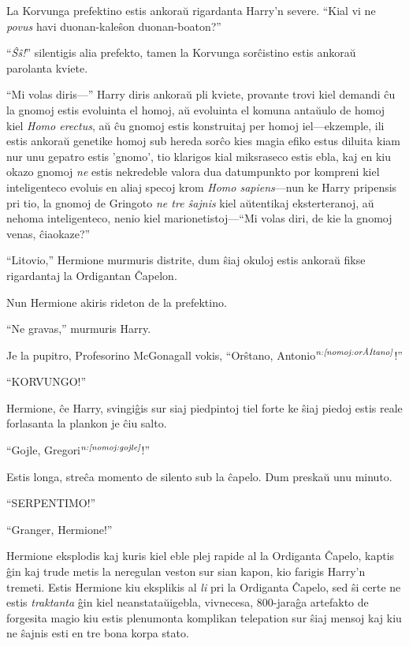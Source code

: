 La Korvunga prefektino estis ankoraŭ rigardanta Harry'n severe. ``Kial
vi ne \emph{povus} havi duonan-kaleŝon duonan-boaton?''

``\emph{Ŝŝ!}'' silentigis alia prefekto, tamen la Korvunga sorĉistino
estis ankoraŭ parolanta kviete.

``Mi volas diris—'' Harry diris ankoraŭ pli kviete, provante trovi
kiel demandi ĉu la gnomoj estis evoluinta el homoj, aŭ evoluinta el
komuna antaŭulo de homoj kiel \emph{Homo erectus}, aŭ ĉu gnomoj estis
konstruitaj per homoj iel—ekzemple, ili estis ankoraŭ genetike homoj
sub hereda sorĉo kies magia efiko estus diluita kiam nur unu gepatro
estis 'gnomo', tio klarigos kial miksraseco estis ebla, kaj en kiu
okazo gnomoj \emph{ne} estis nekredeble valora dua datumpunkto por
kompreni kiel inteligenteco evoluis en aliaj specoj krom \emph{Homo
  sapiens}—nun ke Harry pripensis pri tio, la gnomoj de Gringoto
\emph{ne tre ŝajnis} kiel aŭtentikaj eksterteranoj, aŭ nehoma
inteligenteco, nenio kiel marionetistoj—``Mi volas diri, de kie la
gnomoj venas, ĉiaokaze?''

``Litovio,'' Hermione murmuris distrite, dum ŝiaj okuloj estis ankoraŭ
fikse rigardantaj la Ordigantan Ĉapelon.

Nun Hermione akiris rideton de la prefektino.

``Ne gravas,'' murmuris Harry.

Je la pupitro, Profesorino McGonagall vokis, ``Orŝtano,
Antonio$^{\textit{n:\ref{nomoj:orŝtano}}}$!''

``KORVUNGO!''

Hermione, ĉe Harry, svingiĝis sur siaj piedpintoj tiel forte ke ŝiaj
piedoj estis reale forlasanta la plankon je ĉiu salto.

``Gojle, Gregori$^{\textit{n:\ref{nomoj:gojle}}}$!''

Estis longa, streĉa momento de silento sub la ĉapelo. Dum preskaŭ unu
minuto.

``SERPENTIMO!''

``Granger, Hermione!''

Hermione eksplodis kaj kuris kiel eble plej rapide al la Ordiganta
Ĉapelo, kaptis ĝin kaj trude metis la neregulan veston sur sian kapon,
kio farigis Harry'n tremeti. Estis Hermione kiu eksplikis al \emph{li}
pri la Ordiganta Ĉapelo, sed ŝi certe ne estis \emph{traktanta} ĝin
kiel neanstataŭigebla, vivnecesa, 800-jaraĝa artefakto de forgesita
magio kiu estis plenumonta komplikan telepation sur ŝiaj mensoj kaj
kiu ne ŝajnis esti en tre bona korpa stato.

